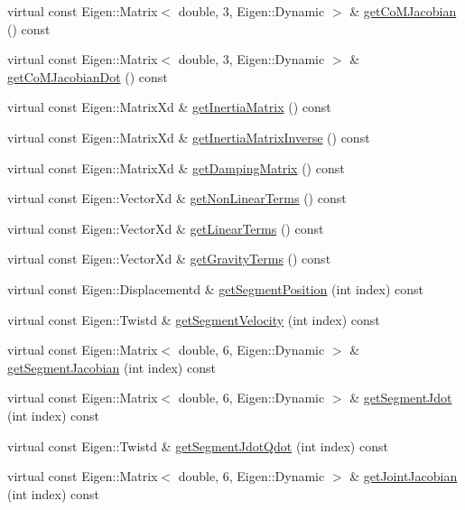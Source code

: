 \begin{DoxyCompactItemize}
\item 
virtual const Eigen\+::\+Matrix$<$ double, 3, Eigen\+::\+Dynamic $>$ \& \hyperlink{classModel3T_ab5d4d81b1f3f01f1b625d8f1ffe0f36e}{get\+Co\+M\+Jacobian} () const 
\item 
virtual const Eigen\+::\+Matrix$<$ double, 3, Eigen\+::\+Dynamic $>$ \& \hyperlink{classModel3T_a6e8c1d7b567d2b3fc20573bdc851bd0f}{get\+Co\+M\+Jacobian\+Dot} () const 
\item 
virtual const Eigen\+::\+Matrix\+Xd \& \hyperlink{classModel3T_ad13cad5adbca9a8a522218872280833b}{get\+Inertia\+Matrix} () const 
\item 
virtual const Eigen\+::\+Matrix\+Xd \& \hyperlink{classModel3T_ab1eb4309cebbf90fd46dc7eba7456615}{get\+Inertia\+Matrix\+Inverse} () const 
\item 
virtual const Eigen\+::\+Matrix\+Xd \& \hyperlink{classModel3T_a4c0695302b47418fbec903ffe8183066}{get\+Damping\+Matrix} () const 
\item 
virtual const Eigen\+::\+Vector\+Xd \& \hyperlink{classModel3T_afbf8e7c59b02e0c192195940b26859d1}{get\+Non\+Linear\+Terms} () const 
\item 
virtual const Eigen\+::\+Vector\+Xd \& \hyperlink{classModel3T_a711f44991a1db73a9c443237c462fdfa}{get\+Linear\+Terms} () const 
\item 
virtual const Eigen\+::\+Vector\+Xd \& \hyperlink{classModel3T_ad9735ee4733dbe8b2d5a205f41af6645}{get\+Gravity\+Terms} () const 
\item 
virtual const Eigen\+::\+Displacementd \& \hyperlink{classModel3T_a8762db7f9dd5df93fd8bcd3e240043f6}{get\+Segment\+Position} (int index) const 
\item 
virtual const Eigen\+::\+Twistd \& \hyperlink{classModel3T_a9ca640b4d9a5ff18fcb091b14980001b}{get\+Segment\+Velocity} (int index) const 
\item 
virtual const Eigen\+::\+Matrix$<$ double, 6, Eigen\+::\+Dynamic $>$ \& \hyperlink{classModel3T_a0cc8687f388b78b0c9f86c189d5dcded}{get\+Segment\+Jacobian} (int index) const 
\item 
virtual const Eigen\+::\+Matrix$<$ double, 6, Eigen\+::\+Dynamic $>$ \& \hyperlink{classModel3T_a2ae3614161d7493f9084b033a8f74a94}{get\+Segment\+Jdot} (int index) const 
\item 
virtual const Eigen\+::\+Twistd \& \hyperlink{classModel3T_a0c0b4cd0387556bae0b752fc9f79ea92}{get\+Segment\+Jdot\+Qdot} (int index) const 
\item 
virtual const Eigen\+::\+Matrix$<$ double, 6, Eigen\+::\+Dynamic $>$ \& \hyperlink{classModel3T_a501f41be46abca9605e17c3cfa66eb45}{get\+Joint\+Jacobian} (int index) const 

\end{DoxyCompactItemize}

